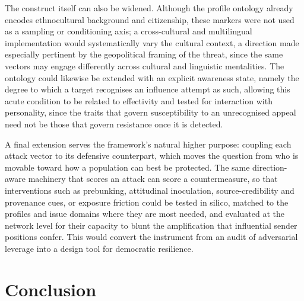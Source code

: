\documentclass[11pt,a4paper]{article}
\begin{document}
The construct itself can also be widened. Although the profile ontology already encodes
ethnocultural background and citizenship, these markers were not used as a sampling or conditioning
axis; a cross-cultural and multilingual implementation would systematically vary the cultural
context, a direction made especially pertinent by the geopolitical framing of the threat, since the
same vectors may engage differently across cultural and linguistic mentalities. The ontology could
likewise be extended with an explicit awareness state, namely the degree to which a target
recognises an influence attempt as such, allowing this acute condition to be related to effectivity
and tested for interaction with personality, since the traits that govern susceptibility to an
unrecognised appeal need not be those that govern resistance once it is detected.

A final extension serves the framework's natural higher purpose: coupling each attack vector to its
defensive counterpart, which moves the question from who is movable toward how a population can best
be protected. The same direction-aware machinery that scores an attack can score a countermeasure, so
that interventions such as prebunking, attitudinal inoculation, source-credibility and provenance
cues, or exposure friction could be tested in silico, matched to the profiles and issue domains
where they are most needed, and evaluated at the network level for their capacity to blunt the
amplification that influential sender positions confer. This would convert the instrument from an
audit of adversarial leverage into a design tool for democratic resilience.

\section{Conclusion}
\end{document}
